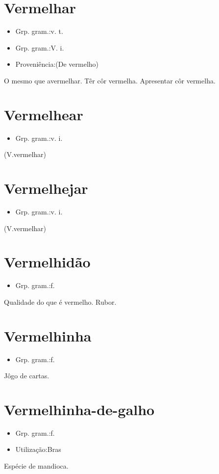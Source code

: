 \documentclass{article}
\begin{document}
\section{Vermelhar}
\begin{itemize}
\item {Grp. gram.:v. t.}
\end{itemize}
\begin{itemize}
\item {Grp. gram.:V. i.}
\end{itemize}
\begin{itemize}
\item {Proveniência:(De \textunderscore vermelho\textunderscore )}
\end{itemize}
O mesmo que \textunderscore avermelhar\textunderscore .
Têr côr vermelha.
Apresentar côr vermelha.
\section{Vermelhear}
\begin{itemize}
\item {Grp. gram.:v. i.}
\end{itemize}
(V.vermelhar)
\section{Vermelhejar}
\begin{itemize}
\item {Grp. gram.:v. i.}
\end{itemize}
(V.vermelhar)
\section{Vermelhidão}
\begin{itemize}
\item {Grp. gram.:f.}
\end{itemize}
Qualidade do que é vermelho.
Rubor.
\section{Vermelhinha}
\begin{itemize}
\item {Grp. gram.:f.}
\end{itemize}
Jôgo de cartas.
\section{Vermelhinha-de-galho}
\begin{itemize}
\item {Grp. gram.:f.}
\end{itemize}
\begin{itemize}
\item {Utilização:Bras}
\end{itemize}
Espécie de mandioca.
\end{document}
